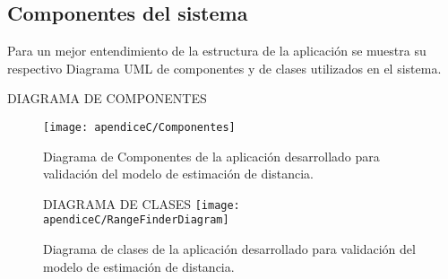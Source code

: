 \subsection{Componentes del sistema}
Para un mejor entendimiento de la estructura de la aplicación se muestra su respectivo Diagrama UML 
de componentes y de clases utilizados en el sistema. 

DIAGRAMA DE COMPONENTES
\begin{figure}[h]
 \centering
  \texttt{[image: apendiceC/Componentes]}
  \caption{Diagrama de Componentes de la aplicación desarrollado para validación del modelo de estimación de distancia.}
\end{figure}

\begin{sidewaysfigure}
DIAGRAMA DE CLASES
 \centering
  \texttt{[image: apendiceC/RangeFinderDiagram]}
  \caption{Diagrama de clases de la aplicación desarrollado para validación del modelo de 
estimación de distancia.}
\end{sidewaysfigure}





